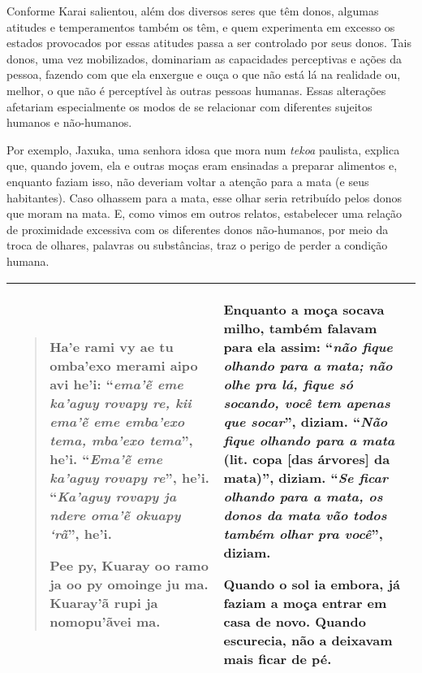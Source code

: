 Conforme Karai salientou, além dos diversos seres que têm donos, algumas
atitudes e temperamentos também os têm, e quem experimenta em excesso os
estados provocados por essas atitudes passa a ser controlado por seus
donos. Tais donos, uma vez mobilizados, dominariam as capacidades
perceptivas e ações da pessoa, fazendo com que ela enxergue e ouça o que
não está lá na realidade ou, melhor, o que não é perceptível às outras
pessoas humanas. Essas alterações afetariam especialmente os modos de se
relacionar com diferentes sujeitos humanos e não-humanos.

Por exemplo, Jaxuka, uma senhora idosa que mora num \emph{tekoa}
paulista, explica que, quando jovem, ela e outras moças eram ensinadas a
preparar alimentos e, enquanto faziam isso, não deveriam voltar a
atenção para a mata (e seus habitantes). Caso olhassem para a mata, esse
olhar seria retribuído pelos donos que moram na mata. E, como vimos em
outros relatos, estabelecer uma relação de proximidade excessiva com os
diferentes donos não-humanos, por meio da troca de olhares, palavras ou
substâncias, traz o perigo de perder a condição humana.

\begin{longtable}[]{@{}ll@{}}
\toprule
\begin{minipage}[t]{0.48\columnwidth}\raggedright\strut
\begin{quote}
Ha'e rami vy ae tu omba'exo merami aipo avi he'i: ``\emph{ema'ẽ eme
ka'aguy rovapy re, kii ema'ẽ eme emba'exo tema, mba'exo tema}'', he'i.
``\emph{Ema'ẽ eme ka'aguy rovapy re}'', he'i. ``\emph{Ka'aguy rovapy ja
ndere oma'ẽ okuapy `rã}'', he'i.

Pee py, Kuaray oo ramo ja oo py omoinge ju ma. Kuaray'ã rupi ja
nomopu'ãvei ma.
\end{quote}\strut
\end{minipage} & \begin{minipage}[t]{0.48\columnwidth}\raggedright\strut
Enquanto a moça socava milho, também falavam para ela assim: ``\emph{não
fique olhando para a mata; não olhe pra lá, fique só socando, você tem
apenas que socar}'', diziam. ``\emph{Não fique olhando para a mata}
(lit. copa {[}das árvores{]} da mata)'', diziam. ``\emph{Se ficar
olhando para a mata, os donos da mata vão todos também olhar pra
você}'', diziam.

Quando o sol ia embora, já faziam a moça entrar em casa de novo. Quando
escurecia, não a deixavam mais ficar de pé.\strut
\end{minipage}\tabularnewline
\bottomrule
\end{longtable}

